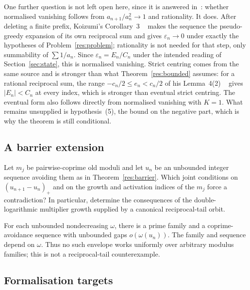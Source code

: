 \documentclass[11pt]{article}
\begin{document}
\begin{remark}
One further question is not left open here, since it is answered
in~\cite{koizumi2025}: whether normalised vanishing follows from
$a_{n+1}/a_n^{2}\to1$ and rationality.  It does.  After
deleting a finite prefix, Koizumi's Corollary~3
~\cite[p.~9]{koizumi2025} makes the sequence the pseudo-greedy expansion of its
own reciprocal sum and gives $\varepsilon_n\to0$ under exactly the hypotheses of
Problem~\ref{res:problem}; rationality is not needed for that step, only
summability of $\sum1/a_n$.  Since $\varepsilon_n=E_n/C_n$ under the intended
reading of Section~\ref{sec:state}, this is normalised vanishing.  Strict
centring comes from the same source and is stronger than what
Theorem~\ref{res:bounded} assumes: for a rational reciprocal sum, the range
$-c_n/2\le e_n<c_n/2$ of his Lemma~4(2)
~\cite[p.~11]{koizumi2025} gives $|E_n|<C_n$ at every index, which is stronger
than eventual strict centring.  The eventual form also follows directly from
normalised vanishing with $K=1$.  What remains unsupplied is hypothesis~(5), the bound
on the negative part, which is why the theorem is still conditional.
\end{remark}

\subsection{A barrier extension}

\begin{problem}\label{res:variablerise}
Let $m_j$ be pairwise-coprime old moduli and let $u_n$ be an unbounded
integer sequence avoiding them as in Theorem~\ref{res:barrier}.
Which joint conditions on $(u_{n+1}-u_n)_+$ and on the growth and activation
indices of the $m_j$ force a contradiction?  In particular, determine the
consequences of the double-logarithmic multiplier growth supplied by a
canonical reciprocal-tail orbit.
\end{problem}

\noindent For each unbounded nondecreasing $\omega$, there is a prime family
and a coprime-avoidance sequence with unbounded gaps $o(\omega(u_n))$.
The family and sequence depend on $\omega$.  Thus no such envelope works
uniformly over arbitrary modulus families; this is not a reciprocal-tail
counterexample.

\subsection*{Formalisation targets}
\end{document}
